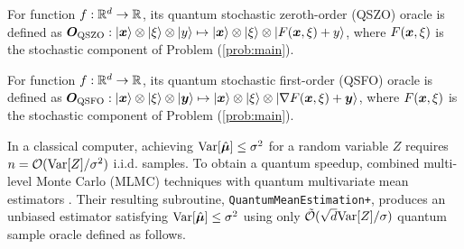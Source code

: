 
	\begin{dfn} \label{dfn:QSZO}
		For function $f: {\mathbb{R}}^d \rightarrow {\mathbb{R}}$, its quantum stochastic zeroth-order (QSZO)  oracle is defined as $ {\bm{O}}_{\rm QSZO}: | {\bm{x}} \rangle \otimes | \xi \rangle \otimes | y \rangle \mapsto | {\bm{x}} \rangle \otimes | \xi \rangle \otimes | F({\bm{x}}, \xi) + y \rangle $, where $F({\bm{x}}, \xi)$ is the stochastic component of Problem (\ref{prob:main}).
	\end{dfn}

	\begin{dfn} \label{dfn:QSFO}
		For function $f: {\mathbb{R}}^d \rightarrow {\mathbb{R}}$, its quantum stochastic first-order (QSFO)  oracle is defined as $ {\bm{O}}_{\rm QSFO}: | {\bm{x}} \rangle \otimes | \xi \rangle \otimes | {\bm{y}} \rangle \mapsto | {\bm{x}} \rangle \otimes | \xi \rangle \otimes | \nabla F({\bm{x}}, \xi) + {\bm{y}} \rangle $, where $F({\bm{x}}, \xi)$ is the stochastic component of Problem (\ref{prob:main}).
	\end{dfn}

	In a classical computer, achieving ${\rm Var}[\hat {{\bm{\mu}}}] \le \sigma^2$ for a random variable $Z$ requires $n = {\mathcal{O}}({\rm Var}[Z]/\sigma^2)$ i.i.d. samples. To obtain a quantum speedup, \citet{sidford2023quantum} combined multi-level Monte Carlo (MLMC) techniques with quantum multivariate mean estimators \citep{cornelissen2022near}. Their resulting subroutine, \texttt{QuantumMeanEstimation+}, produces an unbiased estimator satisfying ${\rm Var}[\hat {{\bm{\mu}}}] \le \sigma^2$ using only $\tilde {{\mathcal{O}}}( \sqrt{d} {\rm Var}[Z] / \sigma)$ quantum sample oracle defined as follows.

